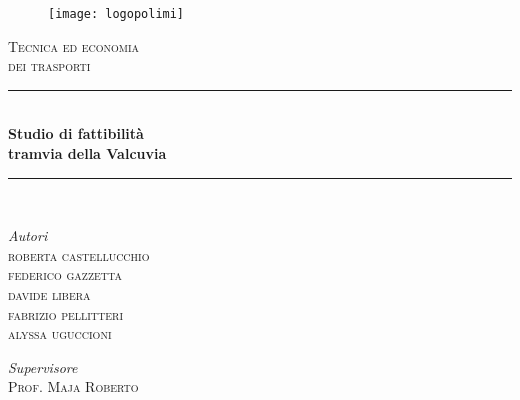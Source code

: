 \documentclass{article}
\renewcommand*\contentsname{Indice dei contenuti}
\begin{document}
\begin{titlepage}
\newcommand{\HRule}{\rule{\linewidth}{0.5mm}}
\center
\begin{figure}[H]
\centering
\texttt{[image: logopolimi]}
\end{figure}	
\textsc{\Large Tecnica ed economia \\dei trasporti}\\[0.5cm] 

\HRule\\[0.2cm]
\center
{\LARGE\bfseries Studio di fattibilità\\
\vspace{1mm}
 tramvia della Valcuvia}\\[0.5cm]
\HRule\\[0.5cm]
	\begin{minipage}{0.4\textwidth}
			\large
			\begin{flushleft}
			\textit{Autori}\\
			\textsc{roberta castellucchio\\
			federico gazzetta\\
			davide libera\\
			fabrizio pellitteri\\
			alyssa uguccioni} 
			\end{flushleft}
	\end{minipage}
	\begin{minipage}{0.4\textwidth}
		\begin{flushright}
			\large
			\textit{Supervisore}\\
			\textsc{Prof. Maja Roberto} 
		 \end{flushright}
	\end{minipage}

\renewcommand*\contentsname{Summary}
\
\bigskip
\bigskip

\end{titlepage}
\end{document}
